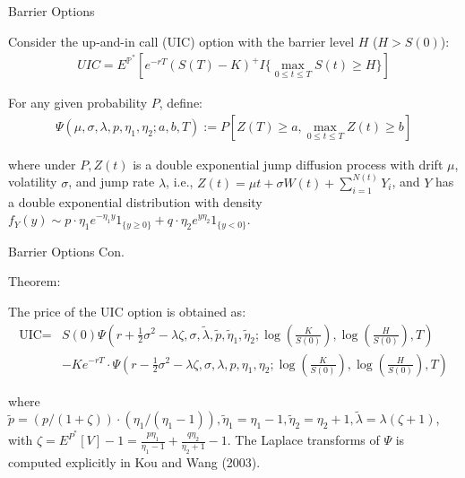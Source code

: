 \documentclass{beamer}
\begin{document}
\begin{frame}{Barrier Options}


    {\footnotesize \footnotesize
    \par Consider the up-and-in call (UIC) option with the barrier level $H$ ($H>S(0)$):
    \vspace{1em}
    \begin{align*}
        UIC = E^{\mathbb{P}^*}[e^{-rT}(S(T) - K)^+I{\{ \max\limits_{0 \leq t \leq T} S(t) \geq H \}}]
    \end{align*}
    \vspace{1em}
    \par  \pause For any given probability \( P \), define:
    \vspace{1em}
    \begin{align*}
        \Psi(\mu, \sigma, \lambda, p, \eta_1, \eta_2; a, b, T):= P[Z(T) \geq a, \max_{0 \leq t \leq T} Z(t) \geq b]
    \end{align*}
    \vspace{1em}
    \par where under \( P, Z(t) \) is a double exponential jump diffusion 
    process with drift \( \mu \), volatility \( \sigma \), and jump rate \( \lambda \), i.e., \( Z(t) = \mu t + \sigma W(t) + \sum_{i=1}^{N(t)} Y_i \), 
    and \( Y \) has a double exponential distribution with 
    density \( f_Y(y) \sim p \cdot \eta_1 e^{-\eta_1 y} 1_{\{y \geq 0\}} + q \cdot \eta_2 e^{y \eta_2} 1_{\{y < 0\}} \).
    }
    
    
\end{frame}
\begin{frame}{Barrier Options Con.}

    \par Theorem:
    \vspace{1em}
    {\footnotesize \footnotesize
    
    \par The price of the UIC option is obtained as:
    \vspace{1em}
    \begin{align*}
        \text{UIC} = & S(0) \Psi \left( r + \frac{1}{2} \sigma^2 - \lambda \zeta, \sigma, \tilde{\lambda}, \tilde{p}, \tilde{\eta}_1, \tilde{\eta}_2; \right. 
        \left. \log \left( \frac{K}{S(0)} \right), \log \left( \frac{H}{S(0)} \right), T \right) \\
        & -Ke^{-rT} \cdot \Psi \left( r - \frac{1}{2} \sigma^2 - \lambda \zeta, \sigma, \lambda, p, \eta_1, \eta_2; \right. 
         \left. \log \left( \frac{K}{S(0)} \right), \log \left( \frac{H}{S(0)} \right), T \right)
    \end{align*}
    \vspace{1em}
    \par where \( \tilde{p} = (p/(1 + \zeta)) \cdot (\eta_1 / (\eta_1 - 1)), \tilde{\eta}_1 
    = \eta_1 - 1, \tilde{\eta}_2 = \eta_2 + 1, \tilde{\lambda} = \lambda(\zeta + 1) \), 
    with \(\zeta = E^{P^*}[V] - 1 = \frac{p\eta_{1}}{\eta_{1}-1} + \frac{q\eta_{2}}{\eta_{2}+1} - 1\). 
    The Laplace transforms of \( \Psi \) is computed explicitly in Kou and Wang (2003).
    }
    
\end{frame}
\end{document}
